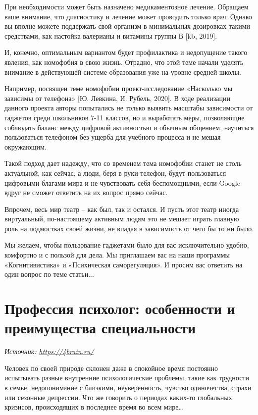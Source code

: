 При необходимости может быть назначено медикаментозное лечение. Обращаем ваше внимание, что диагностику и лечение может проводить только врач. Однако вы вполне можете поддержать свой организм в минимальных дозировках такими средствами, как настойка валерианы и витамины группы В [kb, 2019].

И, конечно, оптимальным вариантом будет профилактика и недопущение такого явления, как номофобия в свою жизнь. Отрадно, что этой теме начали уделять внимание в действующей системе образования уже на уровне средней школы.

Например, посвящен теме номофобии проект-исследование «Насколько мы зависимы от телефона» [Ю. Левкина, И. Рубель, 2020]. В ходе реализации данного проекта авторы попытались не только выявить масштабы зависимости от гаджетов среди школьников 7-11 классов, но и выработать меры, позволяющие соблюдать баланс между цифровой активностью и обычным общением, научиться пользоваться телефоном без ущерба для учебного процесса и не мешая окружающим.

Такой подход дает надежду, что со временем тема номофобии станет не столь актуальной, как сейчас, а люди, беря в руки телефон, будут пользоваться цифровыми благами мира и не чувствовать себя беспомощными, если Google вдруг не сможет ответить на их вопрос прямо сейчас.

Впрочем, весь мир театр – как был, так и остался. И пусть этот театр иногда виртуальный, по-настоящему активным людям это не мешает играть главную роль на подмостках своей жизни, не впадая в зависимость от чего бы то ни было.

Мы желаем, чтобы пользование гаджетами было для вас исключительно удобно, комфортно и с пользой для дела. Мы приглашаем вас на наши программы «Когнитивистика» и «Психическая саморегуляция». И просим вас ответить на один вопрос по теме статьи...

\section{Профессия психолог: особенности и преимущества специальности}

\textit{Источник: \url{https://4brain.ru/}}

Человек по своей природе склонен даже в спокойное время постоянно испытывать разные внутренние психологические проблемы, такие как трудности в семье, недопонимание с близкими, неуверенность, чувство одиночества, страхи или сезонные депрессии. Что же говорить о периодах каких-то глобальных кризисов, происходящих в последнее время во всем мире…

